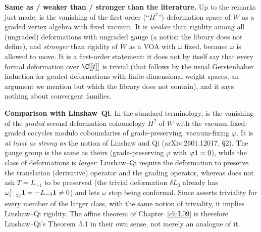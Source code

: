 \begin{dictionary}
\textbf{Same as / weaker than / stronger than the literature.} Up to the remarks just made,
 is the vanishing of the first-order (``$H^2$'') deformation space of $W$ as a
graded vertex algebra with fixed vacuum. It is \emph{weaker} than rigidity among all
(ungraded) deformations with ungraded gauge (a notion the library does not define), and
\emph{stronger} than rigidity of $W$ as a VOA with $\omega$ fixed, because $\omega$ is allowed to
move. It is a first-order statement: it does not by itself say that every formal deformation over
$\C[[t]]$ is trivial (that follows by the usual Gerstenhaber induction for graded deformations with
finite-dimensional weight spaces, an argument we mention but which the library does not contain),
and it says nothing about convergent families.

\textbf{Comparison with Linshaw--Qi.} In the standard terminology,  is the vanishing
of the \emph{graded} second deformation cohomology $H^2$ of $W$ with the vacuum fixed: graded cocycles modulo
coboundaries of grade-preserving, vacuum-fixing $\varphi$. It is \emph{at least as strong as} the notion of
Linshaw and Qi (arXiv:2601.12017, \S2). The gauge group is the same as theirs (grade-preserving $\varphi$ with
$\varphi\mathbf{1} = 0$), while the class of deformations is \emph{larger}: Linshaw--Qi require the
deformation to preserve the translation (derivative) operator and the grading operator, whereas
 does not ask $T = L_{-1}$ to be preserved (the trivial deformation $\delta L_0$
already has $\omega^1_{(-2)}\mathbf{1} = -L_{-3}\mathbf{1}\neq0$) and lets $\omega$ stop being conformal. Since
 asserts triviality for every member of the larger class, with the same notion of
triviality, it implies Linshaw--Qi rigidity. The affine theorem of Chapter~\ref{ch:L09} is therefore
Linshaw--Qi's Theorem~5.1 in their own sense, not merely an analogue of it.


\end{dictionary}
